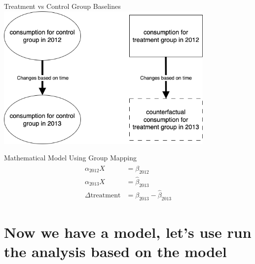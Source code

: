 \documentclass{beamer}
\begin{document}
\begin{frame}{Treatment vs Control Group Baselines}
  \centering
  \includegraphics[width=0.8\textwidth]{images/yoy-mapping.png}
\end{frame}

\begin{frame}{Mathematical Model Using Group Mapping}
  \begin{align*}
    \begin{split}
        \alpha_{2012} X &= \beta_{2012} \\
        \alpha_{2013} X &= \hat\beta_{2013} \\
        \Delta\mbox{treatment} &= \beta_{2013} - \hat\beta_{2013}
    \end{split}
  \end{align*}
\end{frame}

\section{Now we have a model, let's use run the analysis based on the model}
\end{document}
